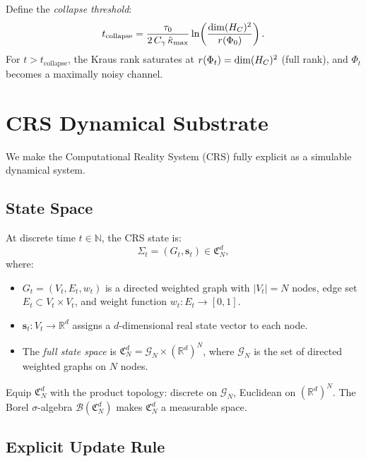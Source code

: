 \begin{corollary}\label{cor:12.1}
Define the \emph{collapse threshold}:
\[
  t_{\mathrm{collapse}} = \frac{\tau_0}{2\,C_\gamma\,\tilde{\kappa}_{\max}}
  \ln\!\left(\frac{\dim(H_C)^2}{r(\Phi_0)}\right).
\]
For $t > t_{\mathrm{collapse}}$, the Kraus rank saturates at
$r(\Phi_t) = \dim(H_C)^2$ (full rank), and $\Phi_t$ becomes a
maximally noisy channel.
\end{corollary}

\section{CRS Dynamical Substrate}
\label{sec:crs}

We make the Computational Reality System (CRS) fully explicit as a
simulable dynamical system.

\subsection{State Space}

\begin{definition}\label{def:12.9}
At discrete time $t \in \mathbb{N}$, the CRS state is:
\[
  \Sigma_t = (G_t, \boldsymbol{s}_t) \in \mathfrak{C}_N^d,
\]
where:
\begin{itemize}
  \item $G_t = (V_t, E_t, w_t)$ is a directed weighted graph with
    $|V_t| = N$ nodes, edge set $E_t \subset V_t \times V_t$, and
    weight function $w_t : E_t \to [0,1]$.
  \item $\boldsymbol{s}_t : V_t \to \mathbb{R}^d$ assigns a $d$-dimensional
    real state vector to each node.
  \item The \emph{full state space} is
    $\mathfrak{C}_N^d = \mathcal{G}_N \times (\mathbb{R}^d)^N$, where
    $\mathcal{G}_N$ is the set of directed weighted graphs on $N$ nodes.
\end{itemize}
Equip $\mathfrak{C}_N^d$ with the product topology:
discrete on $\mathcal{G}_N$, Euclidean on $(\mathbb{R}^d)^N$.
The Borel $\sigma$-algebra $\mathcal{B}(\mathfrak{C}_N^d)$ makes
$\mathfrak{C}_N^d$ a measurable space.
\end{definition}

\subsection{Explicit Update Rule}

